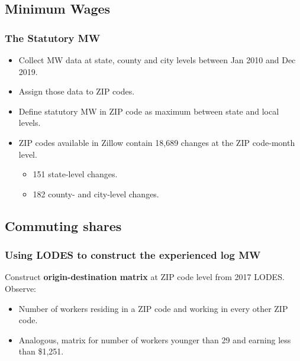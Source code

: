 \documentclass[aspectratio=169]{beamer}
\begin{document}
\subsection{Minimum Wages}

\begin{frame}[label=stat_MW]
	\frametitle{The Statutory MW}
	
	\begin{itemize}
		\item
		Collect MW data at state, county and city levels between Jan 2010 and Dec 2019.
		
		\vspace{2mm} \item
		Assign those data to ZIP codes.
		
		\vspace{2mm} \item
		Define statutory MW in ZIP code as maximum between state and local levels.
		
		\pause
		\vspace{2mm} \item
		ZIP codes available in Zillow contain 18,689 changes at the ZIP code-month level.
		\vspace{-3.5mm} 
		\begin{itemize} \small
			\item 151 state-level changes.
			\item 182 county- and city-level changes.
		\end{itemize}
		
		\hyperlink{dist_mw_changes}{}
	\end{itemize}
	
\end{frame}

\subsection{Commuting shares}

\begin{frame}
	\frametitle{Using LODES to construct the experienced log MW}
	
	Construct \textbf{origin-destination matrix} at ZIP code level from 2017 LODES.
	Observe:
	\begin{itemize} \small
		\item Number of workers residing in a ZIP code and working in every other 
		ZIP code.
		\item Analogous, matrix for number of workers younger than 29 and earning less than 
		\$1,251.
	\end{itemize}
\end{frame}
\end{document}
